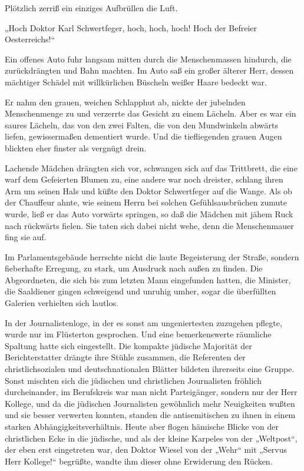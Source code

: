 Plötzlich zerriß ein einziges Aufbrüllen die Luft.

„Hoch Doktor Karl Schwertfeger, hoch, hoch, hoch! Hoch der Befreier
Oesterreichs!“

Ein offenes Auto fuhr langsam mitten durch die Menschenmassen
hindurch, die zurückdrängten und Bahn machten. Im Auto saß ein
großer älterer Herr, dessen mächtiger Schädel mit willkürlichen
Büscheln weißer Haare bedeckt war.

Er nahm den grauen, weichen Schlapphut ab, nickte der jubelnden
Menschenmenge zu und verzerrte das Gesicht zu einem Lächeln. Aber
es war ein saures Lächeln, das von den zwei Falten, die von den
Mundwinkeln abwärts liefen, gewissermaßen dementiert wurde. Und die
tiefliegenden grauen Augen blickten eher finster als vergnügt
drein.

Lachende Mädchen drängten sich vor, schwangen sich auf das
Trittbrett, die eine warf dem Gefeierten Blumen zu, eine andere war
noch dreister, schlang ihren Arm um seinen Hals und küßte den
Doktor Schwertfeger auf die Wange. Als ob der Chauffeur ahnte, wie
seinem Herrn bei solchen Gefühlsausbrüchen zumute wurde, ließ er
das Auto vorwärts springen, so daß die Mädchen mit jähem Ruck nach
rückwärts fielen. Sie taten sich dabei nicht wehe, denn die
Menschenmauer fing sie auf.

Im Parlamentsgebäude herrschte nicht die laute Begeisterung der
Straße, sondern fieberhafte Erregung, zu stark, um Ausdruck nach
außen zu finden. Die Abgeordneten, die sich bis zum letzten Mann
eingefunden hatten, die Minister, die Saaldiener gingen schweigend
und unruhig umher, sogar die überfüllten Galerien verhielten sich
lautlos.

In der Journalistenloge, in der es sonst am
ungeniertesten zuzugehen pflegte, wurde nur im Flüsterton
gesprochen. Und eine bemerkenswerte räumliche Spaltung hatte sich
eingestellt. Die kompakte jüdische Majorität der Berichterstatter
drängte ihre Stühle zusammen, die Referenten der christlichsozialen
und deutschnationalen Blätter bildeten ihrerseits eine Gruppe.
Sonst mischten sich die jüdischen und christlichen Journalisten
fröhlich durcheinander, im Berufskreis war man nicht Parteigänger,
sondern nur der Herr Kollege, und da die jüdischen Journalisten
gewöhnlich mehr Neuigkeiten wußten und sie besser verwerten
konnten, standen die antisemitischen zu ihnen in einem starken
Abhängigkeitsverhältnis. Heute aber flogen hämische Blicke von der
christlichen Ecke in die jüdische, und als der kleine Karpeles von
der „Weltpost“, der eben erst eingetreten war, den Doktor Wiesel
von der „Wehr“ mit „Servus Herr Kollege!“ begrüßte, wandte ihm
dieser ohne Erwiderung den Rücken.

